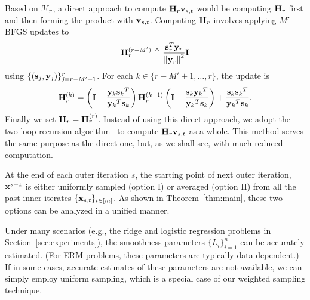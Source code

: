 \documentclass[10pt,twocolumn,journal]{IEEEtran}
\begin{document}

Based on $\mathcal{H}_r$, a direct approach to compute $\mathbf{H}_r\mathbf{v}_{s,t}$ would be computing $\mathbf{H}_r$ first and then forming the product with $\mathbf{v}_{s,t}$. Computing $\mathbf{H}_r$ involves applying $M'$ BFGS updates to %
\begin{equation}
\mathbf{H}_r^{(r-M')}\triangleq \frac{\mathbf{s}_r^T\mathbf{y}_r}{\left\Vert\mathbf{y}_r\right\Vert^2}\mathbf{I} \label{eq:def_H0}
\end{equation}
using $\{(\mathbf{s}_j,\mathbf{y}_j)\}_{j=r-M'+1}^r$. For each $k\in\{r-M'+1,\ldots,r\}$, the update is
\begin{equation}
\mathbf{H}^{(k)}_r = \left(\mathbf{I}-\frac{\mathbf{y}_k{\mathbf{s}_k}^T}{{\mathbf{y}_k}^T\mathbf{s}_k}\right)\mathbf{H}^{(k-1)}_r\left(\mathbf{I}-\frac{\mathbf{s}_k{\mathbf{y}_k}^T}{{\mathbf{y}_k}^T\mathbf{s}_k}\right) + \frac{\mathbf{s}_k{\mathbf{s}_k}^T}{{\mathbf{y}_k}^T\mathbf{s}_k}.\label{eq:update_H}
\end{equation}
Finally we set $\mathbf{H}_r = \mathbf{H}_{r}^{(r)}$. %
Instead of using this direct approach, we adopt the two-loop recursion algorithm~\cite[Algorithm 7.4]{Nocedal_06} to compute $\mathbf{H}_r\mathbf{v}_{s,t}$ as a whole. %
This method serves the same purpose as the direct one, but, as we shall see, with  much reduced computation. 

At the end of each outer iteration $s$, the starting point of next outer iteration, $\mathbf{x}^{s+1}$ is either uniformly sampled (option I) or averaged (option II) from all the past inner iterates $\{\mathbf{x}_{s,t}\}_{t\in[m]}$. As shown in Theorem~\ref{thm:main}, these two options can be analyzed in a unified manner. 


\begin{remark}\label{rmk:est_smooth_param}
Under many scenarios (e.g., the ridge  and logistic regression problems in Section~\ref{sec:experiments}), the smoothness parameters $\{L_i\}_{i=1}^n$ can be accurately estimated. (For ERM problems, these parameters are typically data-dependent.) If in some cases, accurate estimates of these parameters are not available, we can simply employ uniform sampling, which is a special case of our weighted sampling technique. %
\end{remark}
\end{document}
